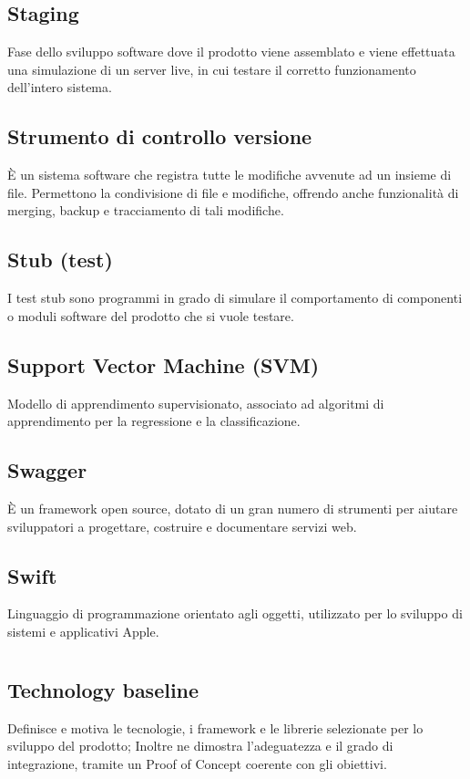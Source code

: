 	\subsection*{Staging}
	Fase dello sviluppo software dove il prodotto viene assemblato e viene effettuata una simulazione di un server live, in cui testare il corretto funzionamento dell'intero sistema.
	\subsection*{Strumento di controllo versione}
	È un sistema software che registra tutte le modifiche avvenute ad un insieme di file. Permettono la condivisione di file e modifiche, offrendo anche funzionalità di merging, backup e tracciamento di tali modifiche.
	\subsection*{Stub (test)}
	I test stub sono programmi in grado di simulare il comportamento di componenti o moduli software del prodotto che si vuole testare.
	\subsection*{Support Vector Machine (SVM)}
	Modello di apprendimento supervisionato, associato ad algoritmi di apprendimento per la regressione e la classificazione.
	\subsection*{Swagger}
	È un framework open source, dotato di un gran numero di strumenti per aiutare sviluppatori a progettare, costruire e documentare servizi web.
	\subsection*{Swift}
	Linguaggio di programmazione orientato agli oggetti, utilizzato per lo sviluppo di sistemi e applicativi Apple.
\pagebreak
\section[T]{}
	\subsection*{Technology baseline}
	Definisce e motiva le tecnologie, i framework e le librerie selezionate per lo sviluppo del prodotto; Inoltre ne dimostra l’adeguatezza e il grado di integrazione, tramite un Proof of Concept coerente con gli obiettivi.

